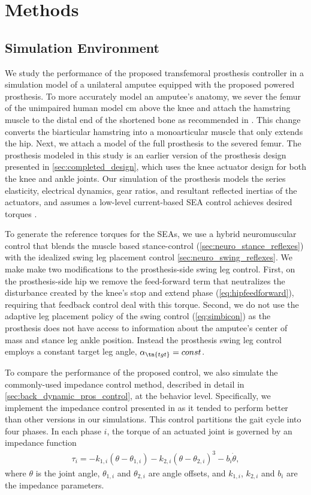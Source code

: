\section{Methods}
\subsection{Simulation Environment}\label{sec:complete_simulation_environ}

We study the performance of the proposed transfemoral prosthesis controller in a
simulation model of a unilateral amputee equipped with the proposed powered
prosthesis. To more accurately model an amputee's anatomy, we sever the femur of
the unimpaired human model \unit[11]{cm} above the knee and attach the hamstring
muscle to the distal end of the shortened bone as recommended in
\citet{brown2012amputation}. This change converts the biarticular hamstring into
a monoarticular muscle that only extends the hip. Next, we attach a model of the
full prosthesis to the severed femur. The prosthesis modeled in this study is an
earlier version of the prosthesis design presented in
\cref{sec:completed_design}, which uses the knee actuator design for both the
knee and ankle joints. Our simulation of the prosthesis models the series
elasticity, electrical dynamics, gear ratios, and resultant reflected inertias
of the actuators, and assumes a low-level current-based SEA control achieves
desired torques \citep{pratt1995series}.

To generate the reference torques for the SEAs, we use a hybrid neuromuscular
control that blends the muscle based stance-control
(\cref{sec:neuro_stance_reflexes}) with the idealized swing leg placement
control \cref{sec:neuro_swing_reflexes}. We make make two modifications to the
prosthesis-side swing leg control.  First, on the prosthesis-side hip we remove
the feed-forward term that neutralizes the disturbance created by the knee's
stop and extend phase (\cref{eq:hipfeedforward}), requiring that feedback
control deal with this torque.  Second, we do not use the adaptive leg placement
policy of the swing control (\cref{eq:simbicon}) as the prosthesis does not have
access to information about the amputee's center of mass and stance leg ankle
position.  Instead the prosthesis swing leg control employs a constant target
leg angle, $\alpha_\tn{tgt} = const$.

To compare the performance of the proposed control, we also simulate the
commonly-used impedance control method, described in detail in
\cref{sec:back_dynamic_pros_control}, at the behavior level.  Specifically, we
implement the impedance control presented in \citet{sup2008design} as it tended
to perform better than other versions in our simulations. This control
partitions the gait cycle into four phases. In each phase $i$, the torque of an
actuated joint is governed by an impedance function
\begin{align} 
    \tau_i = -k_{1,i} (\theta - \theta_{1,i}) - k_{2,i} 
        (\theta - \theta_{2,i})^3 - b_i \dot{\theta} , 
\end{align} 
where $\theta$ is the joint angle, $\theta_{1,i}$ and $\theta_{2,i}$ are angle
offsets, and $k_{1,i}$, $k_{2,i}$ and $b_i$ are the impedance parameters.  

